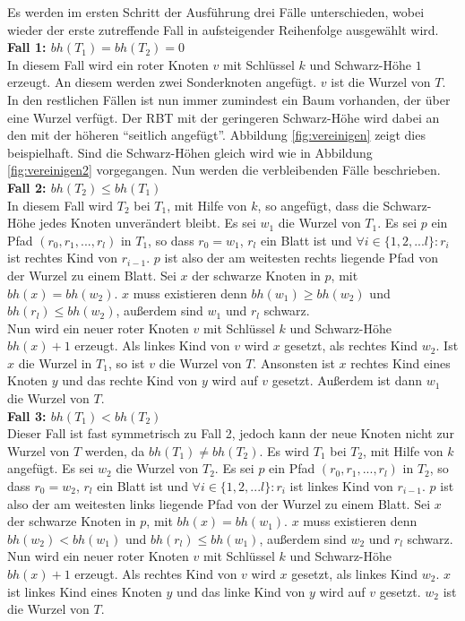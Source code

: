 \documentclass[a4paper,12pt]{article}
\begin{document}
Es werden im ersten Schritt der Ausführung drei Fälle unterschieden, wobei wieder der erste zutreffende Fall in aufsteigender Reihenfolge ausgewählt wird. \\
\noindent\textbf{Fall 1: $bh(T_1) = bh(T_2) = 0$ }\\   
In diesem Fall wird ein roter Knoten $v$ mit Schlüssel $k$ und Schwarz-Höhe $1$ erzeugt. An diesem werden zwei Sonderknoten angefügt. $v$ ist die Wurzel von $T$. \\
In den restlichen Fällen ist nun immer zumindest ein Baum vorhanden, der über eine Wurzel verfügt. Der RBT mit der geringeren Schwarz-Höhe wird dabei an den mit der höheren \enquote{seitlich angefügt}. Abbildung \ref{fig:vereinigen} zeigt dies beispielhaft. Sind die Schwarz-Höhen gleich wird wie in Abbildung \ref{fig:vereinigen2} vorgegangen. Nun werden die verbleibenden Fälle beschrieben.\\
\noindent\textbf{Fall 2: $bh(T_2) \leq bh(T_1)$ }\\
In diesem Fall wird $T_2$ bei $T_1$, mit Hilfe von $k$, so angefügt, dass die Schwarz-Höhe jedes Knoten unverändert bleibt. Es sei $w_1$ die Wurzel von $T_1$. Es sei $p$ ein Pfad $(r_0,r_1,...,r_l)$ in $T_1$, so dass $r_0 = w_1$, $r_l$ ein Blatt ist und $\forall i \in \{1,2,...l\} \colon r_i$  ist rechtes Kind von  $r_{i-1}$. $p$ ist also der am weitesten rechts liegende Pfad von der Wurzel zu einem Blatt. Sei $x$ der schwarze Knoten in $p$, mit $\mathit{bh}(x) = \mathit{bh}(w_2)$. $x$ muss existieren denn $\mathit{bh}(w_1) \geq \mathit{bh}(w_2)$ und $\mathit{bh}(r_l) \leq  \mathit{bh}(w_2)$, außerdem sind $w_1$ und $r_l$ schwarz.\\
Nun wird ein neuer roter Knoten $v$ mit Schlüssel $k$ und Schwarz-Höhe $\mathit{bh}(x) + 1$ erzeugt. Als linkes Kind von $v$  wird $x$ gesetzt, als rechtes Kind $w_2$. Ist $x$ die Wurzel in $T_1$, so ist $v$ die Wurzel von $T$. Ansonsten ist $x$ rechtes Kind eines Knoten $y$ und das rechte Kind von $y$ wird auf $v$ gesetzt. Außerdem ist dann $w_1$ die Wurzel von $T$.     \\  
\noindent\textbf{Fall 3: $bh(T_1) < bh(T_2)$ }\\ 
Dieser Fall ist fast symmetrisch zu Fall 2, jedoch kann der neue Knoten nicht zur Wurzel von $T$ werden, da $bh(T_1) \neq bh(T_2)$.
Es wird $T_1$ bei $T_2$, mit Hilfe von $k$ angefügt. Es sei $w_2$ die Wurzel von $T_2$. Es sei $p$ ein Pfad $(r_0,r_1,...,r_l)$ in $T_2$, so dass $r_0 = w_2$, $r_l$ ein Blatt ist und $\forall i \in \{1,2,...l\} \colon r_i$  ist linkes Kind von  $r_{i-1}$. $p$ ist also der am weitesten links liegende Pfad von der Wurzel zu einem Blatt. Sei $x$ der schwarze Knoten in $p$, mit $\mathit{bh}(x) = \mathit{bh}(w_1)$. $x$ muss existieren denn $\mathit{bh}(w_2) < \mathit{bh}(w_1)$ und $\mathit{bh}(r_l) \leq  \mathit{bh}(w_1)$, außerdem sind $w_2$ und $r_l$ schwarz. Nun wird ein neuer roter Knoten $v$ mit Schlüssel $k$ und Schwarz-Höhe $\mathit{bh}(x) + 1$ erzeugt. Als rechtes Kind von $v$  wird $x$ gesetzt, als linkes Kind $w_2$. $x$ ist linkes Kind eines Knoten $y$ und das linke Kind von $y$ wird auf $v$ gesetzt. $w_2$ ist die Wurzel von $T$. \\   
\end{document}
